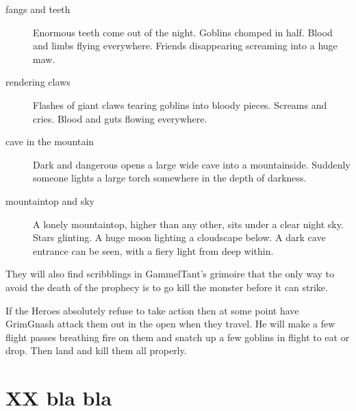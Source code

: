 \begin{description}
\item[fangs and teeth] Enormous teeth come out of the night. Goblins chomped in half. Blood and limbs flying everywhere. Friends disappearing screaming into a huge maw.
\item[rendering claws] Flashes of giant claws tearing goblins into bloody pieces. Screams and cries. Blood and guts flowing everywhere.
\item[cave in the mountain] Dark and dangerous opens a large wide cave into a mountainside. Suddenly someone lights a large torch somewhere in the depth of darkness.
\item[mountaintop and sky] A lonely mountaintop, higher than any other, sits under a clear night sky. Stars glinting. A huge moon lighting a cloudscape below. A dark cave entrance can be seen, with a fiery light from deep within.
\end{description}

They will also find scribblings in GammelTant's grimoire that the only way to avoid the death of the prophecy is to go kill the monster before it can strike.

If the Heroes absolutely refuse to take action then at some point have GrimGnash attack them out in the open when they travel. He will make a few flight passes breathing fire on them and snatch up a few goblins in flight to eat or drop. Then land and kill them all properly.




































\clearpage
\section*{XX bla bla}


